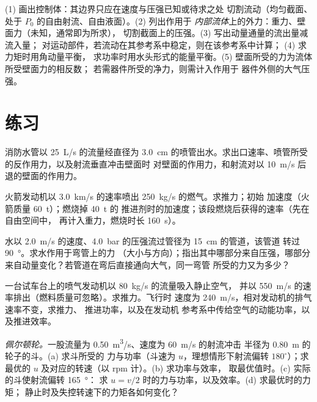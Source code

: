 \begin{method}[建立平衡方程]\label{met:b2:flow-balances:method}
(1) 画出控制体：其边界只应在速度与压强已知或待求之处
切割流动（均匀截面、
处于 $P_0$ 的自由射流、自由液面）。(2) 列出作用于
\emph{内部流体}上的外力：重力、壁面力（未知，通常即为所求），
切割截面上的压强。(3) 写出动量通量的流出量减流入量；
对运动部件，若流动在其参考系中稳定，则在该参考系中计算；
(4) 求力矩时用角动量平衡，
求功率时用水头形式的能量平衡。(5) 壁面所受的力为流体所受壁面力的相反数；
若需器件所受的净力，则需计入作用于
器件外侧的大气压强。
\end{method}

\section{练习}

\begin{exercise}[$\star$]\label{exo:b2:flow-balances:1}
消防水管以 \qty{25}{L/s} 的流量经直径为 \qty{3.0}{cm}
的喷管出水。求出口速率、喷管所受的反作用力，以及射流垂直冲击壁面时
对壁面的作用力，和射流对以 \qty{10}{m/s} 后退的壁面的作用力。
\end{exercise}

\begin{exercise}[$\star$]\label{exo:b2:flow-balances:2}
火箭发动机以 \qty{3.0}{km/s} 的速率喷出 \qty{250}{kg/s} 的燃气。求推力；初始
加速度（火箭质量 \qty{60}{t}）；燃烧掉 \qty{40}{t} 的
推进剂时的加速度；该段燃烧后获得的速率（先在自由空间中，
再计入重力，燃烧时长 \qty{160}{s}）。
\end{exercise}

\begin{exercise}[$\star$]\label{exo:b2:flow-balances:3}
水以 \qty{2.0}{m/s} 的速度、\qty{4.0}{bar} 的压强流过管径为 \qty{15}{cm} 的管道，该管道
转过 \qty{90}{\degree}。求水作用于弯管上的力
（大小与方向）；指出其中哪部分来自压强，哪部分
来自动量变化？若管道在弯后直接通向大气，同一弯管
所受的力又为多少？
\end{exercise}

\begin{exercise}[$\star$]\label{exo:b2:flow-balances:4}
一台试车台上的喷气发动机以 \qty{80}{kg/s} 的流量吸入静止空气，
并以 \qty{550}{m/s} 的速率排出（燃料质量可忽略）。求推力。飞行时
速度为 \qty{240}{m/s}，相对发动机的排气速率不变，求推力、
推进功率，以及在发动机
参考系中传给空气的动能功率，以及推进效率。
\end{exercise}

\begin{exercise}[$\star\star$]\label{exo:b2:flow-balances:5}
\emph{佩尔顿轮。}一股流量为 \qty{0.50}{m^3/s}、速度为 \qty{60}{m/s} 的射流冲击
半径为 \qty{0.80}{m} 的轮子的斗。(a) 求斗所受的
力与功率（斗速为 $u$，理想情形下射流偏转 $180^\circ$）；求最优的 $u$
及对应的转速（以 rpm 计）。(b) 求功率与效率，
取最优值时。(c) 实际的斗使射流偏转 \qty{165}{\degree}：
求 $u = v/2$ 时的力与功率，以及效率。(d) 求最优时的力矩；
静止时及失控转速下的力矩各如何变化？
\end{exercise}

